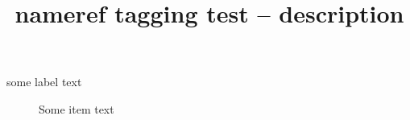 \documentclass{article}
\title{nameref tagging test -- description}
\begin{document}
\begin{description}
\item[some label text\label{foo}]
Some item text
\end{description}
\end{document}
